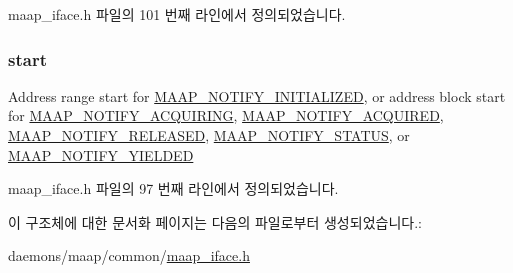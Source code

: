 maap\+\_\+iface.\+h 파일의 101 번째 라인에서 정의되었습니다.

\subsubsection[{\texorpdfstring{start}{start}}]{ start}\hypertarget{struct_maap___notify_a6a51e9baeec9b06ae477cf6475efc71d}{}\label{struct_maap___notify_a6a51e9baeec9b06ae477cf6475efc71d}
Address range start for \hyperlink{maap__iface_8h_a0d45e125fb876b383321d96bc510285ea1933d7302204862df14f845d2566183c}{M\+A\+A\+P\+\_\+\+N\+O\+T\+I\+F\+Y\+\_\+\+I\+N\+I\+T\+I\+A\+L\+I\+Z\+ED}, or address block start for \hyperlink{maap__iface_8h_a0d45e125fb876b383321d96bc510285ea0f5d99d0f124fe7233cacefd53f26127}{M\+A\+A\+P\+\_\+\+N\+O\+T\+I\+F\+Y\+\_\+\+A\+C\+Q\+U\+I\+R\+I\+NG}, \hyperlink{maap__iface_8h_a0d45e125fb876b383321d96bc510285ea37a35b37b6f804ebc82248ae3ed110c6}{M\+A\+A\+P\+\_\+\+N\+O\+T\+I\+F\+Y\+\_\+\+A\+C\+Q\+U\+I\+R\+ED}, \hyperlink{maap__iface_8h_a0d45e125fb876b383321d96bc510285eadcdf0612242dddc5976bc7eb80ae8813}{M\+A\+A\+P\+\_\+\+N\+O\+T\+I\+F\+Y\+\_\+\+R\+E\+L\+E\+A\+S\+ED}, \hyperlink{maap__iface_8h_a0d45e125fb876b383321d96bc510285ea993b057f5516f007248e70006319c846}{M\+A\+A\+P\+\_\+\+N\+O\+T\+I\+F\+Y\+\_\+\+S\+T\+A\+T\+US}, or \hyperlink{maap__iface_8h_a0d45e125fb876b383321d96bc510285ea438f0d11e6e3a74550cab4c378f9aeba}{M\+A\+A\+P\+\_\+\+N\+O\+T\+I\+F\+Y\+\_\+\+Y\+I\+E\+L\+D\+ED} 

maap\+\_\+iface.\+h 파일의 97 번째 라인에서 정의되었습니다.



이 구조체에 대한 문서화 페이지는 다음의 파일로부터 생성되었습니다.\+:\begin{DoxyCompactItemize}
\item 
daemons/maap/common/\hyperlink{maap__iface_8h}{maap\+\_\+iface.\+h}\end{DoxyCompactItemize}
